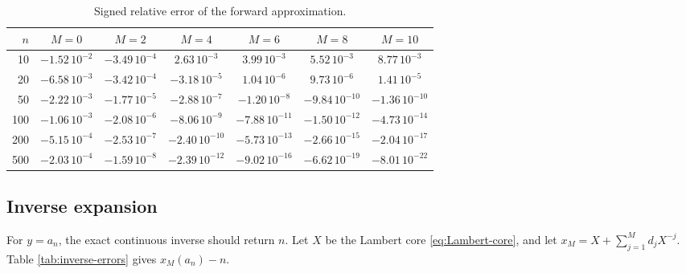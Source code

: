 \documentclass[11pt]{article}
\theoremstyle{definition}
\theoremstyle{remark}
\begin{document}
\begin{table}[htbp]
\centering
\caption{Signed relative error of the forward approximation.}
\label{tab:forward-errors}
\scriptsize
\setlength{\tabcolsep}{4.2pt}
\begin{tabular}{rcccccc}
\toprule
$n$ & $M=0$ & $M=2$ & $M=4$ & $M=6$ & $M=8$ & $M=10$\\
\midrule
10  & $-1.52\,10^{-2}$ & $-3.49\,10^{-4}$ & $ 2.63\,10^{-3}$ & $ 3.99\,10^{-3}$ & $ 5.52\,10^{-3}$ & $ 8.77\,10^{-3}$\\
20  & $-6.58\,10^{-3}$ & $-3.42\,10^{-4}$ & $-3.18\,10^{-5}$ & $ 1.04\,10^{-6}$ & $ 9.73\,10^{-6}$ & $ 1.41\,10^{-5}$\\
50  & $-2.22\,10^{-3}$ & $-1.77\,10^{-5}$ & $-2.88\,10^{-7}$ & $-1.20\,10^{-8}$ & $-9.84\,10^{-10}$ & $-1.36\,10^{-10}$\\
100 & $-1.06\,10^{-3}$ & $-2.08\,10^{-6}$ & $-8.06\,10^{-9}$ & $-7.88\,10^{-11}$ & $-1.50\,10^{-12}$ & $-4.73\,10^{-14}$\\
200 & $-5.15\,10^{-4}$ & $-2.53\,10^{-7}$ & $-2.40\,10^{-10}$ & $-5.73\,10^{-13}$ & $-2.66\,10^{-15}$ & $-2.04\,10^{-17}$\\
500 & $-2.03\,10^{-4}$ & $-1.59\,10^{-8}$ & $-2.39\,10^{-12}$ & $-9.02\,10^{-16}$ & $-6.62\,10^{-19}$ & $-8.01\,10^{-22}$\\
\bottomrule
\end{tabular}
\end{table}

\subsection{Inverse expansion}

For $y=a_n$, the exact continuous inverse should return $n$.  Let $X$ be the
Lambert core \cref{eq:Lambert-core}, and let
$x_M=X+\sum_{j=1}^Md_jX^{-j}$.  Table \ref{tab:inverse-errors} gives
$x_M(a_n)-n$.
\end{document}
